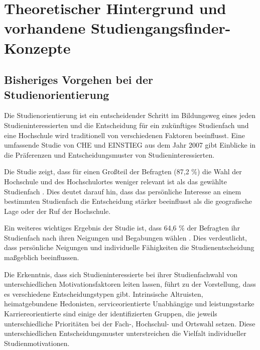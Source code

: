 \section{Theoretischer Hintergrund und vorhandene Studiengangsfinder-Konzepte}
\subsection{Bisheriges Vorgehen bei der Studienorientierung}


Die Studienorientierung ist ein entscheidender Schritt im Bildungsweg eines
jeden Studieninteressierten und die Entscheidung für ein zukünftiges Studienfach
und eine Hochschule wird traditionell von verschiedenen Faktoren beeinflusst.
Eine umfassende Studie von CHE und EINSTIEG aus dem Jahr 2007 gibt Einblicke in
die Präferenzen und Entscheidungsmuster von Studieninteressierten.

Die Studie zeigt, dass für einen Großteil der Befragten (87,2 \%) die Wahl der
Hochschule und des Hochschulortes weniger relevant ist als das gewählte
Studienfach \parencite{hachmeister_einflussfaktoren_2023}. Dies deutet darauf hin, dass das
persönliche Interesse an einem bestimmten Studienfach die Entscheidung stärker
beeinflusst als die geografische Lage oder der Ruf der Hochschule.

Ein weiteres wichtiges Ergebnis der Studie ist, dass 64,6 \% der Befragten ihr
Studienfach nach ihren Neigungen und Begabungen wählen
\parencite{hachmeister_einflussfaktoren_2023}. Dies verdeutlicht, dass persönliche Neigungen und
individuelle Fähigkeiten die Studienentscheidung maßgeblich beeinflussen.

Die Erkenntnis, dass sich Studieninteressierte bei ihrer Studienfachwahl von
unterschiedlichen Motivationsfaktoren leiten lassen, führt zu der Vorstellung,
dass es verschiedene Entscheidungstypen gibt. Intrinsische Altruisten,
heimatgebundene Hedonisten, serviceorientierte Unabhängige und leistungsstarke
Karriereorientierte sind einige der identifizierten Gruppen, die jeweils
unterschiedliche Prioritäten bei der Fach-, Hochschul- und Ortswahl setzen.
Diese unterschiedlichen Entscheidungsmuster unterstreichen die Vielfalt
individueller Studienmotivationen. \parencite{hachmeister_einflussfaktoren_2023}

